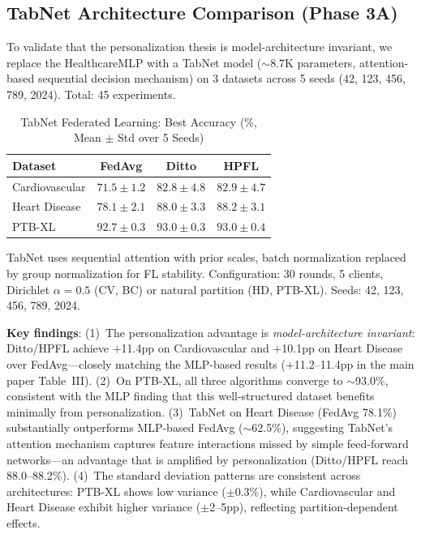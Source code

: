 \documentclass[conference]{IEEEtran}
\begin{document}
\subsection{TabNet Architecture Comparison (Phase 3A)}
\label{sec:tabnet_comparison}

To validate that the personalization thesis is model-architecture invariant, we replace the HealthcareMLP with a TabNet model ($\sim$8.7K parameters, attention-based sequential decision mechanism) on 3 datasets across 5 seeds (42, 123, 456, 789, 2024). Total: 45 experiments.

\begin{table}[htbp]
\centering
\caption{TabNet Federated Learning: Best Accuracy (\%, Mean $\pm$ Std over 5 Seeds)}
\label{tab:tabnet_comparison}
\small
\begin{tabular}{lccc}
\toprule
\textbf{Dataset} & \textbf{FedAvg} & \textbf{Ditto} & \textbf{HPFL} \\
\midrule
Cardiovascular & $71.5 \pm 1.2$ & $82.8 \pm 4.8$ & $\mathbf{82.9 \pm 4.7}$ \\
Heart Disease & $78.1 \pm 2.1$ & $88.0 \pm 3.3$ & $\mathbf{88.2 \pm 3.1}$ \\
PTB-XL & $92.7 \pm 0.3$ & $\mathbf{93.0 \pm 0.3}$ & $93.0 \pm 0.4$ \\
\bottomrule
\end{tabular}

\vspace{1mm}
\par{\footnotesize TabNet uses sequential attention with prior scales, batch normalization replaced by group normalization for FL stability. Configuration: 30 rounds, 5 clients, Dirichlet $\alpha{=}0.5$ (CV, BC) or natural partition (HD, PTB-XL). Seeds: 42, 123, 456, 789, 2024.}
\end{table}

\textbf{Key findings}: (1)~The personalization advantage is \textit{model-architecture invariant}: Ditto/HPFL achieve $+$11.4pp on Cardiovascular and $+$10.1pp on Heart Disease over FedAvg---closely matching the MLP-based results ($+$11.2--11.4pp in the main paper Table~III). (2)~On PTB-XL, all three algorithms converge to $\sim$93.0\%, consistent with the MLP finding that this well-structured dataset benefits minimally from personalization. (3)~TabNet on Heart Disease (FedAvg 78.1\%) substantially outperforms MLP-based FedAvg ($\sim$62.5\%), suggesting TabNet's attention mechanism captures feature interactions missed by simple feed-forward networks---an advantage that is amplified by personalization (Ditto/HPFL reach 88.0--88.2\%). (4)~The standard deviation patterns are consistent across architectures: PTB-XL shows low variance ($\pm$0.3\%), while Cardiovascular and Heart Disease exhibit higher variance ($\pm$2--5pp), reflecting partition-dependent effects.
\end{document}
